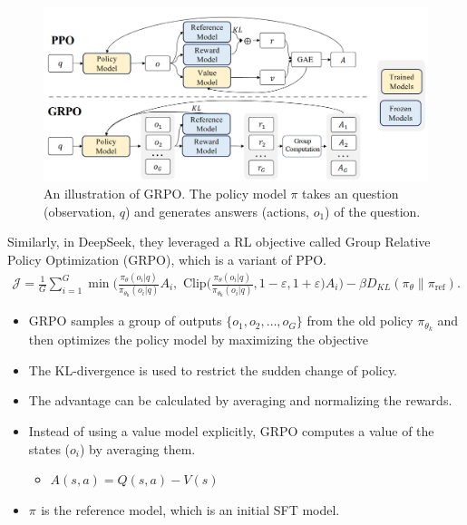 \begin{figure}[t]
	\centering
	\includegraphics[scale=0.5]{./images/transformer/grpo.png}
	\caption{An illustration of GRPO. The policy model $\pi$ takes an question (\ie observation, $q$) and generates answers (\ie actions, $o_1$) of the question. }
\end{figure}

Similarly, in DeepSeek, they leveraged a RL objective called Group Relative Policy Optimization (GRPO), which is a variant of PPO. 
\begin{align*}
	\mathcal{J} = \frac{1}{G}\sum_{i=1}^{G} \min \Bigg(\frac{\pi_{\theta}\left(o_i | q\right)}{\pi_{\theta_{\text {k}}}\left(o_i | q\right)} A_i, \textrm{ Clip}\Bigg(\frac{\pi_{\theta}\left(o_i | q\right)}{\pi_{\theta_{\text {k}}}\left(o_i | q\right)}, 1-\varepsilon, 1+\varepsilon\Bigg) A_{i}\Bigg) -\beta D_{KL}(\pi_{\theta}\| \pi_{\text{ref}}).
\end{align*}
\begin{itemize}
	\item GRPO samples a group of outputs $\{o_1, o_2,\dots, o_G \}$ from the old policy $\pi_{\theta_k}$ and then optimizes the policy model by maximizing the objective 
	\item The KL-divergence is used to restrict the sudden change of policy.
	\item The advantage can be calculated by averaging and normalizing the rewards.
	\item Instead of using a value model explicitly, GRPO computes a value of the states (\ie $o_i$) by averaging them. 
		\begin{itemize}
			\item $A(s,a) = Q(s,a)-V(s)$
		\end{itemize}
	\item $\pi_{\text{}}$ is the reference model, which is an initial SFT model. 
\end{itemize}

